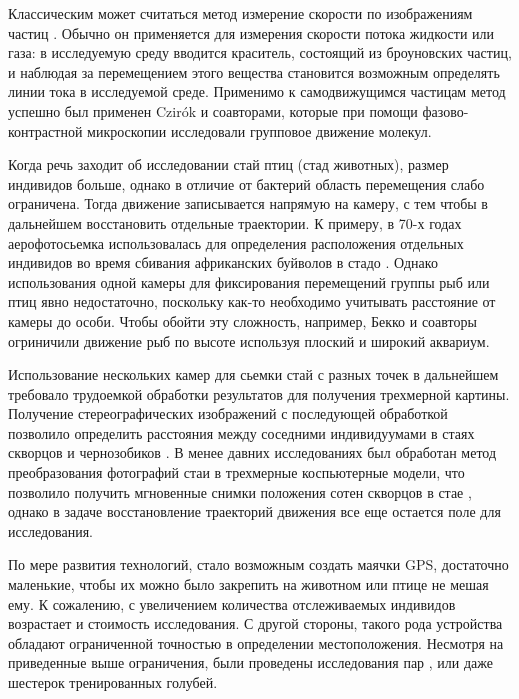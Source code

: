 	Классическим может считаться метод измерение скорости по изображениям частиц \cite{raffel2007}. Обычно он применяется для измерения скорости потока жидкости или газа: в исследуемую среду вводится краситель, состоящий из броуновских частиц, и наблюдая за перемещением этого вещества становится возможным определять линии тока в исследуемой среде. Применимо к самодвижущимся частицам метод успешно был применен Czir\'{o}k и соавторами\cite{csahok1997}, которые при помощи фазово-контрастной микроскопии исследовали групповое движение молекул.

	Когда речь заходит об исследовании стай птиц (стад животных), размер индивидов больше, однако в отличие от бактерий область перемещения слабо ограничена. Тогда движение записывается напрямую на камеру, с тем чтобы в дальнейшем восстановить отдельные траектории. К примеру, в 70-х годах аерофотосьемка использовалась для определения расположения отдельных индивидов во время сбивания африканских буйволов в стадо \cite{sinclair1977}. Однако использования одной камеры для фиксирования перемещений группы рыб или птиц явно недостаточно, поскольку как-то необходимо учитывать расстояние от камеры до особи. Чтобы обойти эту сложность, например, Бекко и соавторы \cite{becco2006} огриничили движение рыб по высоте используя плоский и широкий аквариум.

	Использование нескольких камер для сьемки стай с разных точек в дальнейшем требовало трудоемкой обработки результатов для получения трехмерной картины. Получение стереографических изображений с последующей обработкой позволило определить расстояния между соседними индивидуумами в стаях скворцов и чернозобиков \cite{major1978}. В менее давних исследованиях был обработан метод преобразования фотографий стаи в трехмерные коспьютерные модели, что позволило получить мгновенные снимки положения сотен скворцов в стае \cite{ballerini2008}, однако в задаче восстановление траекторий движения все еще остается поле для исследования.

	По мере развития технологий, стало возможным создать маячки GPS, достаточно маленькие, чтобы их можно было закрепить на животном или птице не мешая ему. К сожалению, с увеличением количества отслеживаемых индивидов возрастает и стоимость исследования. С другой стороны, такого рода устройства обладают ограниченной точностью в определении местоположения. Несмотря на приведенные выше ограничения, были проведены исследования пар \cite{biro2006,nagy2010}, или даже шестерок \cite{dellariccia2008} тренированных голубей.

